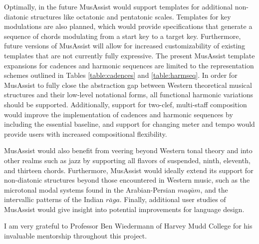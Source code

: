 \documentclass{article}
\begin{document}
Optimally, in the future MusAssist would support templates for additional non-diatonic structures like octatonic and pentatonic scales. Templates for key modulations are also planned, which would provide specifications that generate a sequence of chords modulating from a start key to a target key. Furthermore, future versions of MusAssist will allow for increased customizability of existing templates that are not currently fully expressive. The present MusAssist template expansions for cadences and harmonic sequences are limited to the representation schemes outlined in Tables \ref{table:cadences} and \ref{table:harmseq}. In order for MusAssist to fully close the abstraction gap between Western theoretical musical structures and their low-level notational forms, all functional harmonic variations should be supported. Additionally, support for two-clef, multi-staff composition would improve the implementation of cadences and harmonic sequences by including the essential baseline, and support for changing meter and tempo would provide users with increased compositional flexibility.

MusAssist would also benefit from veering beyond Western tonal theory and into other realms such as jazz by supporting all flavors of suspended, ninth, eleventh, and thirteen chords. Furthermore, MusAssist would ideally extend its support for non-diatonic structures beyond those encountered in Western music, such as the microtonal modal systems found in the Arabian-Persian $maq\bar{a}m$, and the intervallic patterns of the Indian $r\bar{a}ga$. Finally, additional user studies of MusAssist would give insight into potential improvements for language design.

\begin{acknowledgments}
I am very grateful to Professor Ben Wiedermann of Harvey Mudd College for his invaluable mentorship throughout this project.
\end{acknowledgments} 


\balance %


\end{document}

